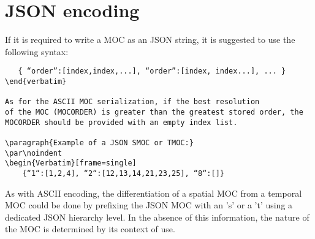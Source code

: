 \section{JSON encoding}
If it is required to write a MOC as an JSON string,
it is suggested to use the following syntax:

\par\noindent
\begin{Verbatim}
   { “order”:[index,index,...], “order”:[index, index...], ... }
\end{verbatim}

As for the ASCII MOC serialization, if the best resolution
of the MOC (MOCORDER) is greater than the greatest stored order, the
MOCORDER should be provided with an empty index list.

\paragraph{Example of a JSON SMOC or TMOC:}
\par\noindent
\begin{Verbatim}[frame=single]
    {“1“:[1,2,4], “2“:[12,13,14,21,23,25], “8“:[]}
\end{Verbatim}

As with ASCII encoding, the differentiation of a spatial MOC from a temporal MOC could be done by prefixing the JSON MOC with an 's' or a 't' using a dedicated JSON hierarchy level. In the absence of this information, the nature of the MOC is determined by its context of use.

